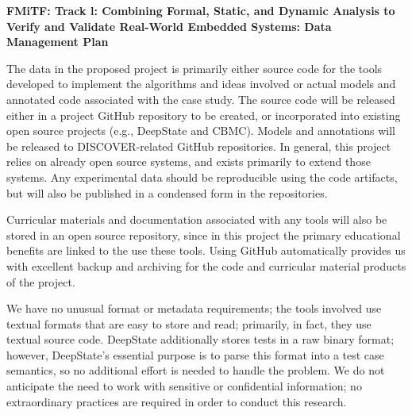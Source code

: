\documentclass[12pt]{article}
\begin{document}

\begin{center}
  {\large\sf\textbf{FMiTF: Track l: Combining Formal, Static, and
  Dynamic Analysis to Verify and Validate Real-World Embedded Systems: Data Management Plan}}
\end{center}

The data in the proposed project is primarily either source code for
the tools developed to implement the algorithms and ideas involved or
actual models and annotated code associated with the case study.  The source code will be released either in a project GitHub repository to be created, or incorporated into existing open source projects (e.g., DeepState and CBMC).  Models and annotations will be released to DISCOVER-related GitHub repositories.  In general, this project relies on already open source systems, and exists primarily to extend those systems.  Any experimental data should be reproducible using the code artifacts, but will also be published in a condensed form in the repositories.

Curricular
materials and documentation associated with any tools will also be stored in
an open source repository, since in this project the primary
educational benefits are linked to the use these tools.  Using GitHub automatically provides us with excellent backup
and archiving for the code and curricular material products of the
project.

We have no unusual format or metadata requirements; the
tools involved use textual formats that are easy to store and read;
primarily, in fact, they use textual source code.  DeepState additionally stores tests in a raw binary format; however, DeepState's essential purpose is to parse this format into a test case semantics, so no additional effort is needed to handle the problem.  
We do not anticipate the need to work with sensitive or confidential
information; no extraordinary practices are required in order to
conduct this research.
\end{document}

